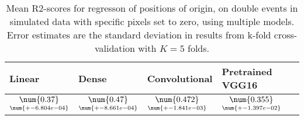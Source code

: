 \begin{table}
\centering
\caption{
Mean R2-scores for regresson of positions of origin, on double events in simulated data with specific pixels
set to zero, using multiple models. 
Error estimates are the standard deviation in results from k-fold cross-validation 
with $K=5$ folds.
}
\label{tab:regression-simulated-double-position-pixelmod-r2}
\begin{tabular}{llll}
\toprule
                                            Linear &                                              Dense &                                       Convolutional &                                    Pretrained VGG16 \\
\midrule
 $\underset{\num{+- 6.804e-04 }  }{\num{ 0.37 } }$ &  $\underset{\num{+- 8.661e-04 }  }{\num{ 0.47 } }$ &  $\underset{\num{+- 1.841e-03 }  }{\num{ 0.472 } }$ &  $\underset{\num{+- 1.397e-02 }  }{\num{ 0.355 } }$ \\
\bottomrule
\end{tabular}
\end{table}
